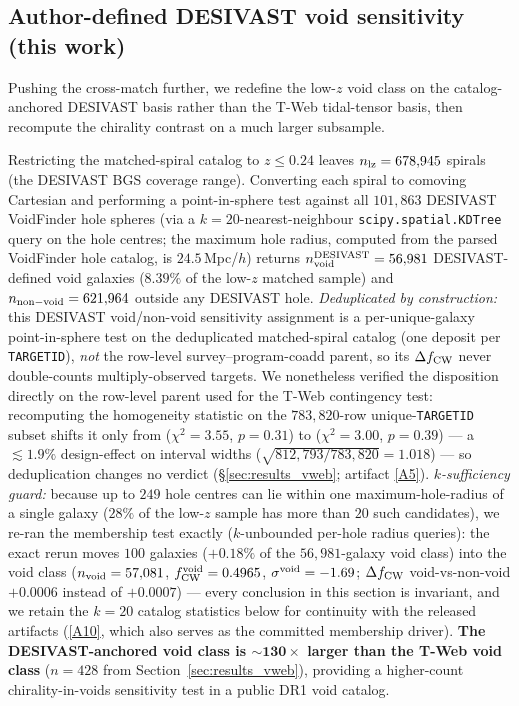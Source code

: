 \documentclass[twocolumn,linenumbers]{aastex702}
\newcommand{\repoBase}{https://github.com/Hubify-Projects/bigbounce/blob/main}
\begin{document}
\subsection{Author-defined DESIVAST void sensitivity (this work)}\label{sec:desivast_anchored_void}

Pushing the cross-match further, we redefine the low-$z$ void class on the
catalog-anchored DESIVAST basis rather than the T-Web tidal-tensor
basis, then recompute the chirality contrast on a much larger
subsample.

Restricting the matched-spiral catalog to $z \leq 0.24$ leaves
$n_{\rm lz} = 678{,}945$ spirals (the DESIVAST BGS coverage range).
Converting each spiral to comoving Cartesian and performing a
point-in-sphere test against all $101{,}863$ DESIVAST VoidFinder
hole spheres (via a $k = 20$-nearest-neighbour
\texttt{scipy.spatial.KDTree} query on the hole centres; the maximum
hole radius, computed from the parsed VoidFinder hole catalog, is
$24.5\,$Mpc/$h$) returns
$n_{\rm void}^{\rm DESIVAST} = 56{,}981$ DESIVAST-defined void galaxies
($8.39\%$ of the low-$z$ matched sample) and $n_{\rm non-void} =
621{,}964$ outside any DESIVAST hole.
\emph{Deduplicated by construction:} this DESIVAST void/non-void
sensitivity assignment is a per-unique-galaxy point-in-sphere test on
the deduplicated matched-spiral catalog (one deposit per
\texttt{TARGETID}), \emph{not} the row-level survey--program-coadd
parent, so its $\Delta f_{\rm CW}$ never double-counts multiply-observed
targets. We nonetheless verified the disposition directly on the
row-level parent used for the T-Web contingency test: recomputing the
homogeneity statistic on the $783{,}820$-row unique-\texttt{TARGETID}
subset shifts it only from ($\chi^2\!=\!3.55$, $p\!=\!0.31$) to
($\chi^2\!=\!3.00$, $p\!=\!0.39$) --- a $\lesssim\!1.9\%$ design-effect
on interval widths ($\sqrt{812{,}793/783{,}820}\!=\!1.018$) --- so
deduplication changes no verdict (\S\ref{sec:results_vweb}; artifact
\href{\repoBase/pipelines/p5\_desi\_chirality/outputs/21\_r23conf\_meta\_closures.json}{[A5]}).
\emph{$k$-sufficiency guard:} because up to $249$ hole centres can lie
within one maximum-hole-radius of a single galaxy ($28\%$ of the
low-$z$ sample has more than $20$ such candidates), we re-ran the
membership test exactly ($k$-unbounded per-hole radius queries):
the exact rerun moves $100$ galaxies ($+0.18\%$ of the
$56{,}981$-galaxy void class) into the void class
($n_{\rm void} = 57{,}081$, $f_{\rm CW}^{\rm void} = 0.4965$,
$\sigma^{\rm void} = -1.69$; $\Delta f_{\rm CW}$ void-vs-non-void
$+0.0006$ instead of $+0.0007$) — every conclusion in this section is
invariant, and we retain the $k=20$ catalog statistics below for
continuity with the released artifacts
(\href{\repoBase/pipelines/p5\_desi\_chirality/outputs/17\_v0151\_closure\_recomputes.json}{[A10]},
which also serves as the committed membership driver). \textbf{The DESIVAST-anchored
void class is $\boldsymbol{\sim\!130\times}$ larger than the T-Web void
class} ($n = 428$ from Section~\ref{sec:results_vweb}), providing a
higher-count chirality-in-voids sensitivity test in a public DR1 void
catalog.
\end{document}
